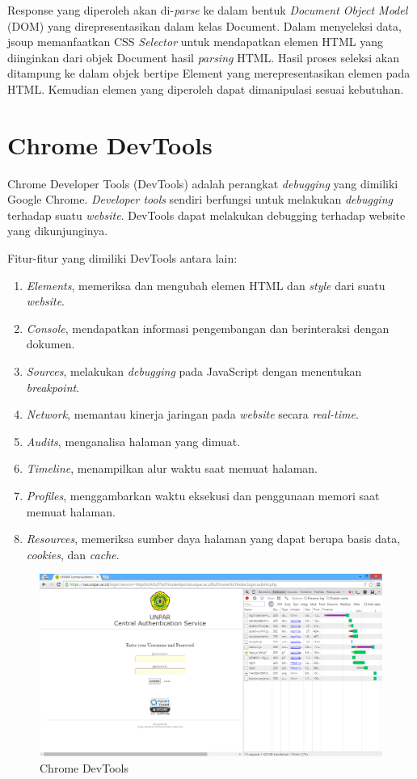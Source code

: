 Response yang diperoleh akan di-\textit{parse} ke dalam bentuk \textit{Document Object Model} (DOM) yang direpresentasikan dalam kelas Document. Dalam menyeleksi data, jsoup memanfaatkan CSS \textit{Selector} untuk mendapatkan elemen HTML yang diinginkan dari objek Document hasil \textit{parsing} HTML. Hasil proses seleksi akan ditampung ke dalam objek bertipe Element yang merepresentasikan elemen pada HTML. Kemudian elemen yang diperoleh dapat dimanipulasi sesuai kebutuhan.

\section{Chrome DevTools}
\label{sec:devtools}

Chrome Developer Tools (DevTools) \cite{devtools} adalah perangkat \textit{debugging} yang dimiliki Google Chrome. \textit{Developer tools} sendiri berfungsi untuk melakukan \textit{debugging} terhadap suatu \textit{website}. DevTools dapat melakukan debugging terhadap website yang dikunjunginya.

Fitur-fitur yang dimiliki DevTools antara lain:
\begin{enumerate}
	\item \textit{Elements}, memeriksa dan mengubah elemen HTML dan \textit{style} dari suatu \textit{website}.
	\item \textit{Console}, mendapatkan informasi pengembangan dan berinteraksi dengan dokumen.
	\item \textit{Sources}, melakukan \textit{debugging} pada JavaScript dengan menentukan \textit{breakpoint}.
	\item \textit{Network}, memantau kinerja jaringan pada \textit{website} secara \textit{real-time}.
	\item \textit{Audits}, menganalisa halaman yang dimuat.
	\item \textit{Timeline}, menampilkan alur waktu saat memuat halaman.
	\item \textit{Profiles}, menggambarkan waktu eksekusi dan penggunaan memori saat memuat halaman.
	\item \textit{Resources}, memeriksa sumber daya halaman yang dapat berupa basis data, \textit{cookies}, dan \textit{cache}.
\end{enumerate}

\begin{figure}
	\centering
	\includegraphics[scale=0.5]{Gambar/chrome-devtools}
	\caption{Chrome DevTools} 
	\label{fig:chrome_devtools}
\end{figure}


